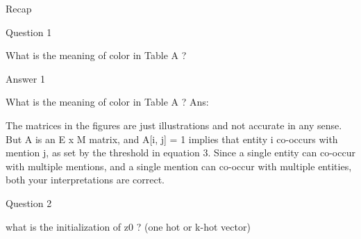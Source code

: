 \documentclass[10pt]{beamer}
\begin{document}
\begin{frame}{Recap}
    \begin{figure}
        \begin{center}
        \end{center}
    \end{figure}
\end{frame}



\begin{frame}{Question 1}

    \begin{exampleblock}{What is the meaning of color in Table A ?}
    \end{exampleblock}

\end{frame}

\begin{frame}{Answer 1}

    \begin{exampleblock}{What is the meaning of color in Table A ?}
        Ans: 
        
        The matrices in the figures are just illustrations and not accurate in any sense. But A is an E x M matrix, and A[i, j] = 1 implies that entity i co-occurs with mention j, as set by the threshold in equation 3. Since a single entity can co-occur with multiple mentions, and a single mention can co-occur with multiple entities, both your interpretations are correct.
    \end{exampleblock}

\end{frame}

\begin{frame}{Question 2}

    \begin{exampleblock}{what is the initialization of z0 ? (one hot or k-hot vector)}
    \end{exampleblock}

\end{frame}
\end{document}
